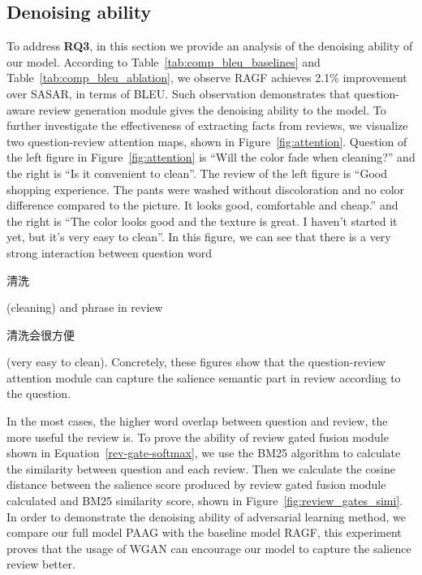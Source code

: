 \subsection{Denoising ability}

To address \textbf{RQ3}, in this section we provide an analysis of the denoising ability of our model. According to Table~\ref{tab:comp_bleu_baselines} and Table~\ref{tab:comp_bleu_ablation}, we observe RAGF achieves 2.1\% improvement over SASAR, in terms of BLEU.
Such observation demonstrates that question-aware review generation module gives the denoising ability to the model.
To further investigate the effectiveness of extracting facts from reviews, we visualize two question-review attention maps, shown in Figure~\ref{fig:attention}.
Question of the left figure in Figure~\ref{fig:attention} is ``Will the color fade when cleaning?'' and the right is ``Is it convenient to clean''. 
The review of the left figure is ``Good shopping experience. The pants were washed without discoloration and no color difference compared to the picture. It looks good, comfortable and cheap.'' and the right is ``The color looks good and the texture is great. I haven't started it yet, but it's very easy to clean''.
In this figure, we can see that there is a very strong interaction between question word \begin{CJK*}{UTF8}{gbsn}清洗\end{CJK*} (cleaning) and phrase in review \begin{CJK*}{UTF8}{gbsn}清洗会很方便\end{CJK*} (very easy to clean).
Concretely, these figures show that the question-review attention module can capture the salience semantic part in review according to the question.


In the most cases, the higher word overlap between question and review, the more useful the review is.
To prove the ability of review gated fusion module shown in Equation~\ref{rev-gate-softmax}, we use the BM25 algorithm to calculate the similarity between question and each review.
Then we calculate the cosine distance between the salience score produced by review gated fusion module calculated and BM25 similarity score, shown in Figure~\ref{fig:review_gates_simi}.
In order to demonstrate the denoising ability of adversarial learning method, we compare our full model PAAG with the baseline model RAGF, this experiment proves that the usage of WGAN can encourage our model to capture the salience review better.

